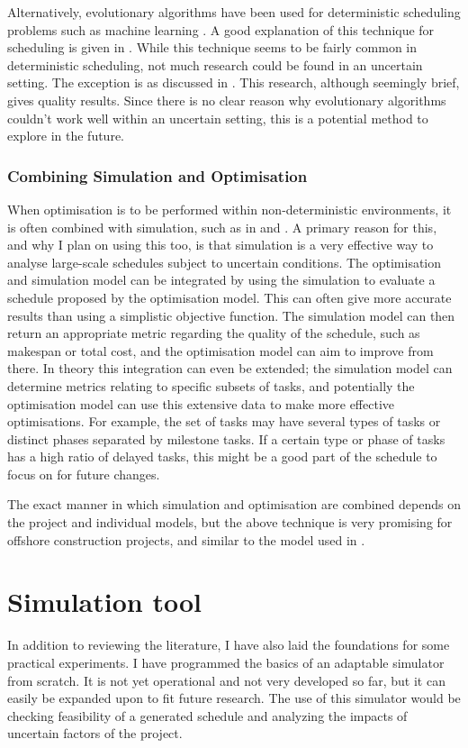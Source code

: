 \documentclass[a4paper,12pt]{article}
\begin{document}
Alternatively, evolutionary algorithms have been used for deterministic scheduling problems such as machine learning \cite{dorndorf1995evolution}. A good explanation of this technique for scheduling is given in \cite{cotta2007memetic}. While this technique seems to be fairly common in deterministic scheduling, not much research could be found in an uncertain setting. The exception is \cite{sevaux2002genetic} as discussed in . This research, although seemingly brief, gives quality results. Since there is no clear reason why evolutionary algorithms couldn't work well within an uncertain setting, this is a potential method to explore in the future. 

\subsubsection{Combining Simulation and Optimisation} \label{ss:simopt}
When optimisation is to be performed within non-deterministic environments, it is often combined with simulation, such as in \cite{de2003integrating} and \cite{bard2015integrating}. A primary reason for this, and why I plan on using this too, is that simulation is a very effective way to analyse large-scale schedules subject to uncertain conditions. The optimisation and simulation model can be integrated by using the simulation to evaluate a schedule proposed by the optimisation model. This can often give more accurate results than using a simplistic objective function. The simulation model can then return an appropriate metric regarding the quality of the schedule, such as makespan or total cost, and the optimisation model can aim to improve from there. In theory this integration can even be extended; the simulation model can determine metrics relating to specific subsets of tasks, and potentially the optimisation model can use this extensive data to make more effective optimisations. For example, the set of tasks may have several types of tasks or distinct phases separated by milestone tasks. If a certain type or phase of tasks has a high ratio of delayed tasks, this might be a good part of the schedule to focus on for future changes. 

The exact manner in which simulation and optimisation are combined depends on the project and individual models, but the above technique is very promising for offshore construction projects, and similar to the model used in \cite{kerkhove2017optimised}. 

\pagebreak

\section{Simulation tool} \label{s:sim}
In addition to reviewing the literature, I have also laid the foundations for some practical experiments. I have programmed the basics of an adaptable simulator from scratch. It is not yet operational and not very developed so far, but it can easily be expanded upon to fit future research. The use of this simulator would be checking feasibility of a generated schedule and analyzing the impacts of uncertain factors of the project.
\end{document}
